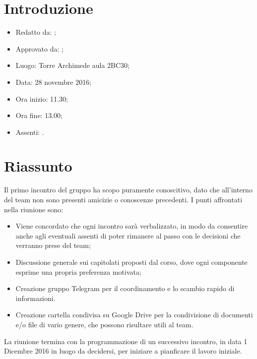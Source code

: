 \section{Introduzione}

	\begin{itemize}
		\item Redatto da: \NS;
		\item Approvato da: \AS;
		\item Luogo: Torre Archimede aula 2BC30;
		\item Data: 28 novembre 2016;
		\item Ora inizio: 11.30;
		\item Ora fine: 13.00;
		\item Assenti: \AN.	
	\end{itemize}

\section{Riassunto}
Il primo incontro del gruppo ha scopo puramente conoscitivo, dato che all’interno del team non sono presenti amicizie o conoscenze precedenti. I punti affrontati nella riunione sono:
\begin{itemize}
	\item Viene concordato che ogni incontro sarà verbalizzato, in modo da consentire anche agli eventuali assenti di poter rimanere al passo con le decisioni che verranno prese del team;
	\item Discussione generale sui capitolati proposti dal corso, dove ogni componente esprime una propria preferenza motivata;
	\item Creazione gruppo Telegram per il coordinamento e lo scambio rapido di informazioni.
	\item Creazione cartella condivisa su Google Drive per la condivisione di documenti e/o file di vario genere, che possono risultare utili al team.
\end{itemize}
La riunione termina con la programmazione di un successivo incontro, in data 1 Dicembre 2016 in luogo da decidersi, per iniziare a pianficare il lavoro iniziale.